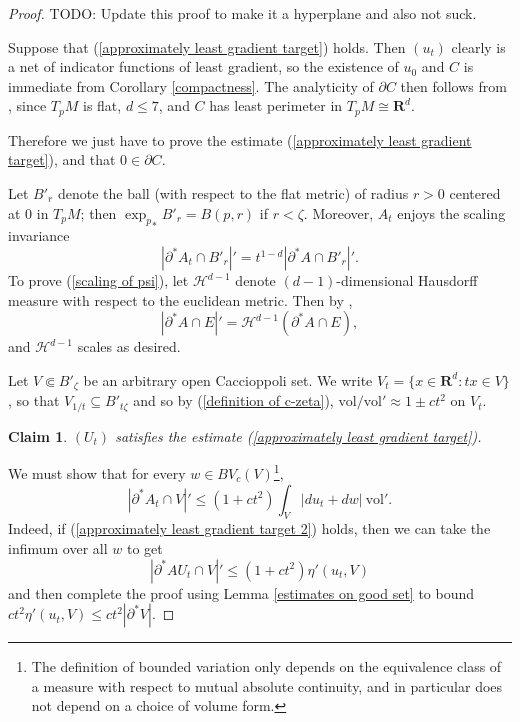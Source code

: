 \documentclass[reqno,12pt,letterpaper]{amsart}
\newcommand{\RR}{\mathbf{R}}
\newcommand{\vol}{\mathrm{vol}}
\newtheorem{claim}[theorem]{Claim}
\theoremstyle{definition}
\numberwithin{equation}{section}
\begin{document}
\begin{proof}
TODO: Update this proof to make it a hyperplane and also not suck.

Suppose that (\ref{approximately least gradient target}) holds.
Then $(u_t)$ clearly is a net of indicator functions of least gradient, so the existence of $u_0$ and $C$ is immediate from Corollary \ref{compactness}.
The analyticity of $\partial C$ then follows from \cite[Corollary 9.5]{Giusti77}, since $T_pM$ is flat, $d \leq 7$, and $C$ has least perimeter in $T_pM \cong \RR^d$.

Therefore we just have to prove the estimate (\ref{approximately least gradient target}), and that $0 \in \partial C$.

Let $B'_r$ denote the ball (with respect to the flat metric) of radius $r > 0$ centered at $0$ in $T_pM$; then ${\exp_p}_* B'_r = B(p, r)$ if $r < \zeta$.
Moreover, $A_t$ enjoys the scaling invariance
\begin{equation}\label{scaling of psi}
|\partial^* A_t \cap B'_r|' = t^{1 - d} |\partial^* A \cap B'_r|'.
\end{equation}
To prove (\ref{scaling of psi}), let $\mathscr H^{d - 1}$ denote $(d-1)$-dimensional Hausdorff measure with respect to the euclidean metric.
Then by \cite[Theorem 4.4]{Giusti77},
$$|\partial^* A \cap E|' = \mathscr H^{d - 1}(\partial^* A \cap E),$$
and $\mathscr H^{d - 1}$ scales as desired.

Let $V \Subset B'_\zeta$ be an arbitrary open Caccioppoli set.
We write $V_t = \{x \in \RR^d: tx \in V\}$, so that $V_{1/t} \subseteq B'_{t\zeta}$ and so by (\ref{definition of c-zeta}), $\vol/\vol' \approx 1 \pm ct^2$ on $V_t$.

\begin{claim}\label{blowup claim 1}
$(U_t)$ satisfies the estimate (\ref{approximately least gradient target}).
\end{claim}

We must show that for every $w \in BV_c(V)$\footnote{The definition of bounded variation only depends on the equivalence class of a measure with respect to mutual absolute continuity, and in particular does not depend on a choice of volume form.},
\begin{equation}\label{approximately least gradient target 2}
|\partial^* A_t \cap V|' \leq (1 + ct^2) \int_V |du_t + dw| ~\vol'.
\end{equation}
Indeed, if (\ref{approximately least gradient target 2}) holds, then we can take the infimum over all $w$ to get
$$|\partial^*AU_t \cap V|' \leq (1 + ct^2) \eta'(u_t, V)$$
and then complete the proof using Lemma \ref{estimates on good set} to bound $ct^2 \eta'(u_t, V) \leq ct^2 |\partial^* V|$.


\end{proof}
\end{document}
